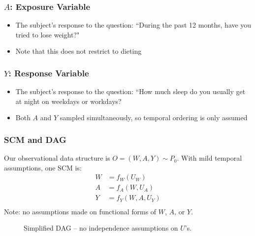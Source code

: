 \documentclass{beamer}
\begin{document}
\begin{frame}
 \frametitle{$A$: Exposure Variable}
  \begin{itemize}
    \item The subject's response to the question: ``During the past 12 months, have you tried to lose weight?"
    \item Note that this does not restrict to dieting
  \end{itemize}
\end{frame}

\begin{frame}
 \frametitle{$Y$: Response Variable}
  \begin{itemize}
    \item The subject's response to the question: ``How much sleep do you usually get at night on weekdays or workdays?
    \item Both $A$ and $Y$ sampled simultaneously, so temporal ordering is only assumed
  \end{itemize}
\end{frame}

\begin{frame}
\frametitle{SCM and DAG}

\begin{minipage}{0.55\linewidth}
Our observational data structure is $O=(W,A,Y) \sim P_0$. With mild temporal assumptions, one SCM is:
\begin{align*}
W &= f_{W}(U_{W}) \\
A &= f_{A}(W,U_{A}) \\
Y &= f_{Y}(W,A,U_{Y}) \\
\end{align*}
Note: no assumptions made on functional forms of $W$, $A$, or $Y$.
\end{minipage}
\begin{minipage}{0.4\linewidth}
  \begin{figure}[h]
    \centering
  \caption{Simplified DAG -- no independence assumptions on $U$'s.}
  \label{fig:DAG}
  \end{figure}
\end{minipage}
\end{frame}
\end{document}
